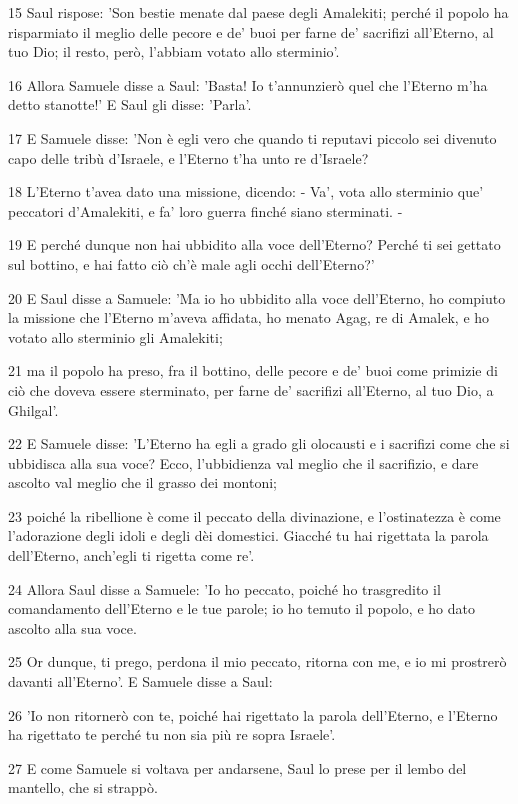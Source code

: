 \par 15 Saul rispose: 'Son bestie menate dal paese degli Amalekiti; perché il popolo ha risparmiato il meglio delle pecore e de' buoi per farne de' sacrifizi all'Eterno, al tuo Dio; il resto, però, l'abbiam votato allo sterminio'.
\par 16 Allora Samuele disse a Saul: 'Basta! Io t'annunzierò quel che l'Eterno m'ha detto stanotte!' E Saul gli disse: 'Parla'.
\par 17 E Samuele disse: 'Non è egli vero che quando ti reputavi piccolo sei divenuto capo delle tribù d'Israele, e l'Eterno t'ha unto re d'Israele?
\par 18 L'Eterno t'avea dato una missione, dicendo: - Va', vota allo sterminio que' peccatori d'Amalekiti, e fa' loro guerra finché siano sterminati. -
\par 19 E perché dunque non hai ubbidito alla voce dell'Eterno? Perché ti sei gettato sul bottino, e hai fatto ciò ch'è male agli occhi dell'Eterno?'
\par 20 E Saul disse a Samuele: 'Ma io ho ubbidito alla voce dell'Eterno, ho compiuto la missione che l'Eterno m'aveva affidata, ho menato Agag, re di Amalek, e ho votato allo sterminio gli Amalekiti;
\par 21 ma il popolo ha preso, fra il bottino, delle pecore e de' buoi come primizie di ciò che doveva essere sterminato, per farne de' sacrifizi all'Eterno, al tuo Dio, a Ghilgal'.
\par 22 E Samuele disse: 'L'Eterno ha egli a grado gli olocausti e i sacrifizi come che si ubbidisca alla sua voce? Ecco, l'ubbidienza val meglio che il sacrifizio, e dare ascolto val meglio che il grasso dei montoni;
\par 23 poiché la ribellione è come il peccato della divinazione, e l'ostinatezza è come l'adorazione degli idoli e degli dèi domestici. Giacché tu hai rigettata la parola dell'Eterno, anch'egli ti rigetta come re'.
\par 24 Allora Saul disse a Samuele: 'Io ho peccato, poiché ho trasgredito il comandamento dell'Eterno e le tue parole; io ho temuto il popolo, e ho dato ascolto alla sua voce.
\par 25 Or dunque, ti prego, perdona il mio peccato, ritorna con me, e io mi prostrerò davanti all'Eterno'. E Samuele disse a Saul:
\par 26 'Io non ritornerò con te, poiché hai rigettato la parola dell'Eterno, e l'Eterno ha rigettato te perché tu non sia più re sopra Israele'.
\par 27 E come Samuele si voltava per andarsene, Saul lo prese per il lembo del mantello, che si strappò.
